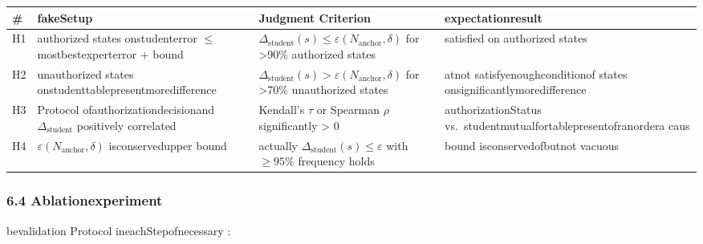 \documentclass[
  12pt,
]{article}
\begin{document}
\begin{longtable}[]{@{}
  >{\raggedright\arraybackslash}p{}
  >{\raggedright\arraybackslash}p{}
  >{\raggedright\arraybackslash}p{}
  >{\raggedright\arraybackslash}p{}@{}}
\toprule\noalign{}
\begin{minipage}[b]{\linewidth}\raggedright
\#
\end{minipage} & \begin{minipage}[b]{\linewidth}\raggedright
fakeSetup
\end{minipage} & \begin{minipage}[b]{\linewidth}\raggedright
Judgment Criterion
\end{minipage} & \begin{minipage}[b]{\linewidth}\raggedright
expectationresult
\end{minipage} \\
\midrule\noalign{}
\endhead
\bottomrule\noalign{}
\endlastfoot
H1 & authorized states onstudenterror \(\le\) mostbestexperterror + bound &
\(\Delta_{\text{student}}(s) \le \varepsilon(N_{\text{anchor}}, \delta)\)
for \textgreater90\% authorized states & satisfied on authorized states \\
H2 & unauthorized states onstudenttablepresentmoredifference &
\(\Delta_{\text{student}}(s) > \varepsilon(N_{\text{anchor}}, \delta)\)
for \textgreater70\% unauthorized states & atnot satisfyenoughconditionof states
onsignificantlymoredifference \\
H3 & Protocol ofauthorizationdecisionand \(\Delta_{\text{student}}\) positively correlated &
Kendall's \(\tau\) or Spearman \(\rho\) significantly \textgreater{} 0 & authorizationStatus
vs.~studentmutualfortablepresentofranordera caus \\
H4 & \(\varepsilon(N_{\text{anchor}}, \delta)\) isconservedupper bound & actually
\(\Delta_{\text{student}}(s) \le \varepsilon\) with \(\ge 95\%\) frequency holds
& bound isconservedofbutnot  vacuous \\
\end{longtable}

\subsubsection{6.4 Ablationexperiment}\label{ux6d88ux878dux5b9eux9a8c}

bevalidation Protocol ineachStepofnecessary :
\end{document}
